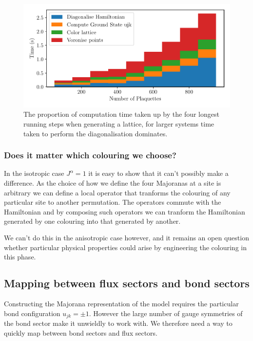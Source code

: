 \begin{figure}
\hypertarget{fig:times}{%
\centering
\includegraphics[width=1\textwidth,height=\textheight]{figure_code/amk_chapter/methods/times/times.pdf}
\caption{The proportion of computation time taken up by the four longest running steps when generating a lattice, for larger systems time taken to perform the diagonalisation dominates.}\label{fig:times}
}
\end{figure}

\hypertarget{does-it-matter-which-colouring-we-choose}{%
\subsubsection{Does it matter which colouring we choose?}\label{does-it-matter-which-colouring-we-choose}}

In the isotropic case \(J^\alpha = 1\) it is easy to show that it can't possibly make a difference. As the choice of how we define the four Majoranas at a site is arbitrary we can define a local operator that tranforms the colouring of any particular site to another permutation. The operators commute with the Hamiltonian and by composing such operators we can tranform the Hamiltonian generated by one colouring into that generated by another.

We can't do this in the anisotropic case however, and it remains an open question whether particular physical properties could arise by engineering the colouring in this phase.

\hypertarget{mapping-between-flux-sectors-and-bond-sectors}{%
\subsection{Mapping between flux sectors and bond sectors}\label{mapping-between-flux-sectors-and-bond-sectors}}

Constructing the Majorana representation of the model requires the particular bond configuration \(u_{jk} = \pm 1\). However the large number of gauge symmetries of the bond sector make it unwieldly to work with. We therefore need a way to quickly map between bond sectors and flux sectors.

